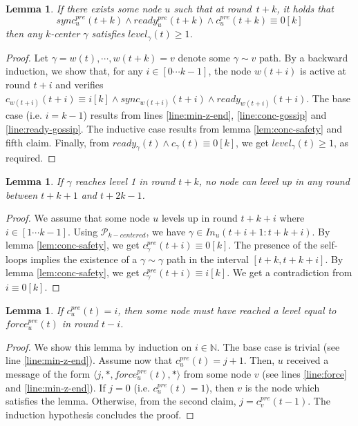 \documentclass[11pt,letterpaper]{article}
\newtheorem{lem}[thm]{Lemma}
\newcommand{\cent}{\gamma}
\begin{document}
\begin{lem} \label{lem:conc-safety-bis}
	If there exists some node $u$ such that at round~$t+k$, it holds that 
	$$sync_u^{pre}(t+k) \wedge ready_u^{pre}(t+k) \wedge c_u^{pre}(t+k) \equiv 0 [k] $$ 
	then any $k$-center $\gamma$ satisfies $level_\cent(t) \geq 1$.
\end{lem}
\begin{proof}
	Let $\cent = w(t), \cdots, w(t+k) = v$ denote some $\cent \sim v$ path.
	By a backward induction, we show that, for any $i \in [0 \cdots k-1]$, the node $w(t+i)$ is active at round $t + i$
	and verifies $c_{w(t+i)}(t+i) \equiv i [k] \wedge sync_{w(t+i)}(t+i) \wedge ready_{w(t+i)}(t+i)$.
	The base case (i.e. $i = k-1$) results from lines \ref{line:min-z-end}, \ref{line:conc-gossip} and \ref{line:ready-gossip}.
	The inductive case results from lemma \ref{lem:conc-safety} and fifth claim.
	Finally, from $ready_\cent(t) \wedge c_\cent(t) \equiv 0[k]$, we get $level_\cent(t) \geq 1$, as required.
\end{proof}

\begin{lem} \label{lem:no-close-level2}
	If $\cent$ reaches level 1 in round $t+k$, no node can level up in any round between $t+k+1$ and $t+2k-1$.
\end{lem}
\begin{proof}
	We assume that some node $u$ levels up in round $t+k+i$ where $i \in [1 \cdots k-1]$.
	Using $\mathcal{P}_{k-centered}$, we have $\cent \in In_u(t+i+1:t+k+i)$.
	By lemma \ref{lem:conc-safety}, we get $c_\cent^{pre}(t+i) \equiv 0 [k]$.
	The presence of the self-loops implies the existence of a $\cent \sim \cent$ path in the interval $[t+k,t+k+i]$.
	By lemma \ref{lem:conc-safety}, we get $c_\cent^{pre}(t+i) \equiv i [k]$.
	We get a contradiction from $i \equiv 0 [k]$.
\end{proof}

\begin{lem} \label{lem:safety-force}
	If $c_u^{pre}(t) = i$, then some node must have reached a level equal to $force_u^{pre}(t)$ in round $t-i$.
\end{lem}
\begin{proof}
	We show this lemma by induction on $i \in \mathds{N}$.
	The base case is trivial (see line \ref{line:min-z-end}).
	Assume now that $c_u^{pre}(t) = j+1$.
	Then, $u$ received a message of the form $\langle j, *, force_u^{pre}(t), * \rangle$ from some node $v$ (see lines \ref{line:force} and \ref{line:min-z-end}).
	If $j = 0$ (i.e. $c_u^{pre}(t) = 1$), then $v$ is the node which satisfies the lemma.
	Otherwise, from the second claim, $j = c_v^{pre}(t-1)$.
	The induction hypothesis concludes the proof.
\end{proof}
\end{document}
